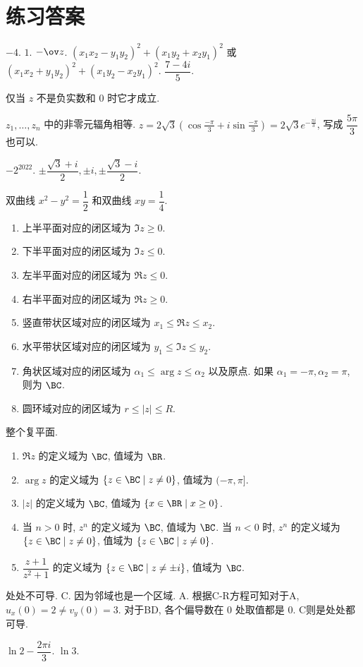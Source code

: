 
\chapter*{练习答案}
\setcounter{chapter}{0}
\setcounter{exer}{0}

\exans $-4$.
\exans $1$.
\exans $-\ov z$.
\exans $(x_1x_2-y_1y_2)^2+(x_1y_2+x_2y_1)^2$ 或 $(x_1x_2+y_1y_2)^2+(x_1y_2-x_2y_1)^2$.
\exans $\dfrac{7-4i}5$.

\exans 仅当 $z$ 不是负实数和 $0$ 时它才成立.

\exans $z_1,\dots,z_n$ 中的非零元辐角相等.
\exans $\displaystyle z=2\sqrt3\left(\cos\frac{-\pi}3+i\sin\frac{-\pi}3\right)=2\sqrt3e^{-\frac{\pi i}3}$, 写成 $\dfrac{5\pi}3$ 也可以.

\exans $-2^{2022}$.
\exans $\pm\dfrac{\sqrt3+i}2,\pm i,\pm\dfrac{\sqrt3-i}2$.

\exans 双曲线 $x^2-y^2=\dfrac12$ 和双曲线 $xy=\dfrac14$.
\exans
\begin{enumerate}
	\item 上半平面对应的闭区域为 $\Im z\ge0$.
	\item 下半平面对应的闭区域为 $\Im z\le0$.
	\item 左半平面对应的闭区域为 $\Re z\le0$.
	\item 右半平面对应的闭区域为 $\Re z\ge0$.
	\item 竖直带状区域对应的闭区域为 $x_1\le\Re z\le x_2$.
	\item 水平带状区域对应的闭区域为 $y_1\le\Im z\le y_2$.
	\item 角状区域对应的闭区域为 $\alpha_1\le \arg z\le \alpha_2$ 以及原点. 如果 $\alpha_1=-\pi,\alpha_2=\pi$, 则为 $\BC$.
	\item 圆环域对应的闭区域为 $r\le|z|\le R$.
\end{enumerate}
\exans 整个复平面.

\exans
\begin{enumerate}
	\item $\Re z$ 的定义域为 $\BC$, 值域为 $\BR$.
	\item $\arg z$ 的定义域为 $\{z\in\BC\mid z\neq 0\}$, 值域为 $(-\pi,\pi]$.
	\item $|z|$ 的定义域为 $\BC$, 值域为 $\{x\in\BR\mid x\ge0\}$.
	\item 当 $n>0$ 时, $z^n$ 的定义域为 $\BC$, 值域为 $\BC$.
	当 $n<0$ 时, $z^n$ 的定义域为 $\{z\in\BC\mid z\neq 0\}$, 值域为 $\{z\in\BC\mid z\neq 0\}$.
	\item $\dfrac{z+1}{z^2+1}$ 的定义域为 $\{z\in\BC\mid z\neq \pm i\}$, 值域为 $\BC$.
\end{enumerate}


\setcounter{exer}{0}


\exans 处处不可导.
\exans C. 因为邻域也是一个区域.
\exans A. 根据C-R方程可知对于A, $u_x(0)=2\neq v_y(0)=3$. 对于BD, 各个偏导数在 $0$ 处取值都是 $0$. C则是处处都可导.

\exans $\ln 2-\dfrac{2\pi i}3$.
\exans $\ln 3$.



